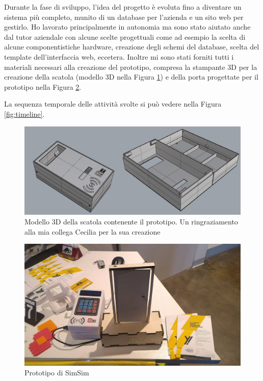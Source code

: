 \documentclass[12pt]{report}
\begin{document}
Durante la fase di sviluppo, l'idea del progetto è evoluta fino a diventare un sistema più completo, munito di un database per l'azienda e un sito web per gestirlo. Ho lavorato principalmente in autonomia ma sono stato aiutato anche dal tutor aziendale con alcune scelte progettuali come ad esempio la scelta di alcune componentistiche hardware, creazione degli schemi del database, scelta del template dell'interfaccia web, eccetera. Inoltre mi sono stati forniti tutti i materiali necessari alla creazione del prototipo, compresa la stampante 3D per la creazione della scatola (modello 3D nella Figura \ref{fig:simsim_3d}) e della porta progettate per il prototipo nella Figura \ref{fig:simsim}.

La sequenza temporale delle attività svolte si può vedere nella Figura \ref{fig:timeline}.

\pagebreak

\vspace*{40px}

\begin{figure}[H]
	\centering
	\includegraphics[width=0.9\linewidth]{./img/simsim_3d.jpeg}
	\caption{Modello 3D della scatola contenente il prototipo. Un ringraziamento alla mia collega Cecilia per la sua creazione}
	\label{fig:simsim_3d}
\end{figure}

\begin{figure}[H]
	\centering
	\includegraphics[width=0.8\linewidth]{./img/simsim.jpeg}
	\caption{Prototipo di SimSim}
	\label{fig:simsim}
\end{figure}
\end{document}
